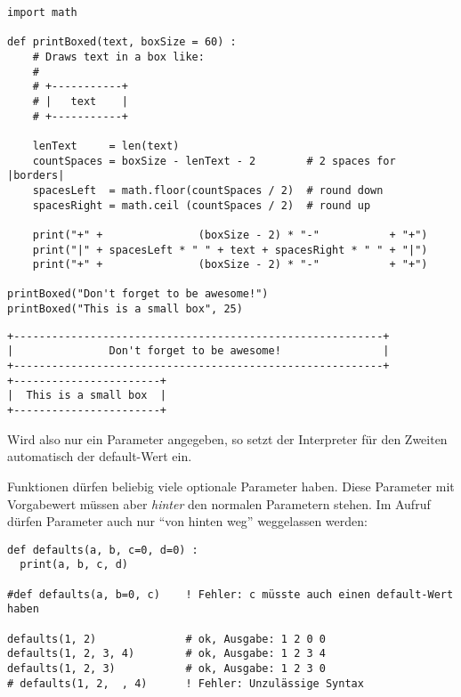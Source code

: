 \begin{codebox}
\begin{verbatim}
import math

def printBoxed(text, boxSize = 60) :
    # Draws text in a box like:
    #
    # +-----------+
    # |   text    |
    # +-----------+
  
    lenText     = len(text)
    countSpaces = boxSize - lenText - 2        # 2 spaces for |borders|
    spacesLeft  = math.floor(countSpaces / 2)  # round down
    spacesRight = math.ceil (countSpaces / 2)  # round up
  
    print("+" +               (boxSize - 2) * "-"           + "+")
    print("|" + spacesLeft * " " + text + spacesRight * " " + "|")
    print("+" +               (boxSize - 2) * "-"           + "+")
  
printBoxed("Don't forget to be awesome!")
printBoxed("This is a small box", 25)
\end{verbatim}
\end{codebox}
\begin{cmdbox}
\begin{verbatim}
+----------------------------------------------------------+
|               Don't forget to be awesome!                |
+----------------------------------------------------------+
+-----------------------+
|  This is a small box  |
+-----------------------+
\end{verbatim}
\end{cmdbox}

Wird also nur ein Parameter angegeben, so setzt der Interpreter für den Zweiten automatisch der default-Wert  ein.

Funktionen dürfen beliebig viele optionale Parameter haben. Diese Parameter mit Vorgabewert müssen aber \emph{hinter} den normalen Parametern stehen. Im Aufruf dürfen Parameter auch nur \enquote{von hinten weg} weggelassen werden:
\begin{codebox}
\begin{verbatim}
def defaults(a, b, c=0, d=0) :
  print(a, b, c, d)
  
#def defaults(a, b=0, c)    ! Fehler: c müsste auch einen default-Wert haben

defaults(1, 2)              # ok, Ausgabe: 1 2 0 0 
defaults(1, 2, 3, 4)        # ok, Ausgabe: 1 2 3 4
defaults(1, 2, 3)           # ok, Ausgabe: 1 2 3 0
# defaults(1, 2,  , 4)      ! Fehler: Unzulässige Syntax
\end{verbatim}
\end{codebox}

